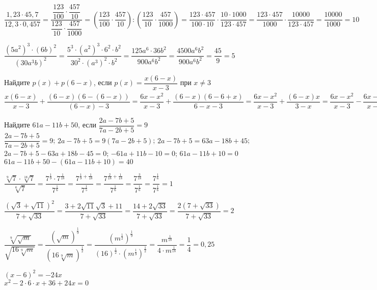 \documentclass[
10pt,
paper=A4,
landscape,
DIV=calc,
twocolumn
]{article}
\begin{document}
\begin{listofex}
	\item \( \dfrac{1,23\cdot45,7}{12,3\cdot0,457}=\dfrac{\dfrac{123}{100}\cdot\dfrac{457}{10}}{\dfrac{123}{10}\cdot\dfrac{457}{1000}}=\left( \dfrac{123}{100}\cdot\dfrac{457}{10} \right):\left( \dfrac{123}{10}\cdot\dfrac{457}{1000} \right)=\dfrac{123\cdot457}{100\cdot10}\cdot\dfrac{10\cdot1000}{123\cdot457}=\dfrac{123\cdot457}{1000}\cdot\dfrac{10000}{123\cdot457}=\dfrac{10000}{1000}=10 \)
	\item \( \dfrac{(5a^2)^3\cdot(6b)^2}{(30a^3b)^2}=\dfrac{5^3\cdot(a^2)^3\cdot6^2\cdot b^2}{30^2\cdot(a^3)^2\cdot b^2}=\dfrac{125a^6\cdot36b^2}{900a^6b^2}=\dfrac{4500a^6b^2}{900a^6b^2}=\dfrac{45}{9}=5 \)
	\item Найдите \( p(x)+p(6-x) \), если \( p(x)=\dfrac{x(6-x)}{x-3} \) при \( x\neq3 \)\\
	\( \dfrac{x(6-x)}{x-3}+\dfrac{(6-x)(6-(6-x))}{(6-x)-3}=\dfrac{6x-x^2}{x-3}+\dfrac{(6-x)(6-6+x)}{6-x-3}=\dfrac{6x-x^2}{x-3}+\dfrac{(6-x)x}{3-x}=\dfrac{6x-x^2}{x-3}-\dfrac{6x-x^2}{x-3}=\dfrac{6x-x^2-(6x-x^2)}{x-3}=\dfrac{0}{x-3}=0 \)
	\item Найдите \( 61a-11b+50 \), если \( \dfrac{2a-7b+5}{7a-2b+5}=9 \)\\
	\( \dfrac{2a-7b+5}{7a-2b+5}=9 \); \( 2a-7b+5=9(7a-2b+5) \); \( 2a-7b+5=63a-18b+45 \); \( 2a-7b+5-63a+18b-45=0 \); \( -61a+11b-10=0 \); \( 61a-11b+10=0 \)\\
	\( 61a-11b+50-(61a-11b+10)=40 \)
	\item \( \dfrac{\sqrt[9]{7}\cdot\sqrt[18]{7}}{\sqrt[6]{7}}=\dfrac{7^{\tfrac{1}{9}}\cdot7^{\tfrac{1}{18}}}{7^{\tfrac{1}{6}}}=\dfrac{7^{\tfrac{1}{9}+\tfrac{1}{18}}}{7^{\tfrac{1}{5}}}=\dfrac{7^{\tfrac{2}{18}+\tfrac{1}{18}}}{7^{\tfrac{1}{6}}}=\dfrac{7^{\tfrac{3}{18}}}{7^{\tfrac{1}{6}}}=\dfrac{7^{\tfrac{1}{6}}}{7^{\tfrac{1}{6}}}=1 \)
	\item \( \dfrac{(\sqrt{3}+\sqrt{11})^2}{7+\sqrt{33}}=\dfrac{3+2\sqrt{11}\sqrt{3}+11}{7+\sqrt{33}}=\dfrac{14+2\sqrt{33}}{7+\sqrt{33}}=\dfrac{2(7+\sqrt{33})}{7+\sqrt{33}}=2 \)
	\item \( \dfrac{\sqrt[9]{\sqrt{m}}}{\sqrt{16\sqrt[9]{m}}}=\dfrac{(\sqrt{m})^{\tfrac{1}{9}}}{(16\sqrt[9]{m})^{\tfrac{1}{2}}}=\dfrac{(m^{\tfrac{1}{2}})^{\tfrac{1}{9}}}{(16)^{\tfrac{1}{2}}\cdot(m^{\tfrac{1}{9}})^{\tfrac{1}{2}}}=\dfrac{m^{\tfrac{1}{18}}}{4\cdot m^{\tfrac{1}{18}}}=\dfrac{1}{4}=0,25 \)
	\newpage
	\item \( (x-6)^2=-24x \)\\
	\( x^2-2\cdot6\cdot x+36+24x=0 \)\\

\end{listofex}
\end{document}
